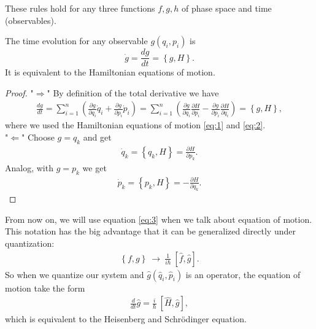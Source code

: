 These rules hold for any three functions $f,g,h$ of phase space and time (observables).
\begin{theorem}\label{theorem}
The time evolution for any observable $g(q_i,p_i)$ is
\begin{equation}\label{eq:3}
\dot{g} = \frac{dg}{dt} = \left \{ g,H \right \}. 
\end{equation}
It is equivalent to the Hamiltonian equations of motion.
\end{theorem}
\begin{proof}
"$\Rightarrow$" By definition of the total derivative we have
\begin{align}
\frac{dg}{dt} = \sum_{i=1}^n \left( \frac{\partial g}{\partial q_i} \dot{q}_i + \frac{\partial g}{\partial p_i} \dot{p}_i \right) = \sum_{i=1}^n \left( \frac{\partial g}{\partial q_i} \frac{\partial H}{\partial p_i} - \frac{\partial g}{\partial p_i} \frac{\partial H}{\partial q_i} \right) = \left \{ g,H \right \},
\end{align}
where we used the Hamiltonian equations of motion \eqref{eq:1} and \eqref{eq:2}. \\
"$\Leftarrow$" Choose $g = q_k$ and get
\begin{align}
\dot{q}_k = \left \{ q_k,H \right \} = \frac{\partial H}{\partial p_k}.
\end{align}
Analog, with $g = p_k$ we get
\begin{align}
\dot{p}_k = \left \{ p_k,H \right \} = - \frac{\partial H}{\partial q_k}.
\end{align}
\end{proof}
From now on, we will use equation \eqref{eq:3} when we talk about equation of motion. This notation has the big advantage that it can be generalized directly under quantization:
\begin{align}
\left \{ f,g \right \} \  \longrightarrow \ \frac{1}{i \hbar} \ [\hat{f},\hat{g}].
\end{align}
So when we quantize our system and $\hat{g}(\hat{q}_i,\hat{p}_i)$ is an operator, the equation of motion take the form
\begin{align}
\frac{d}{dt}\hat{g} = \frac{i}{\hbar} \ [\hat{H} , \hat{g}],
\end{align}
which is equivalent to the Heisenberg and Schrödinger equation.


